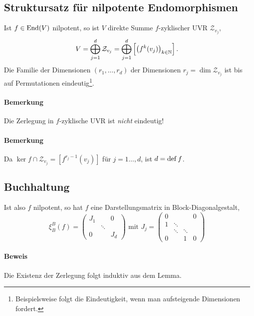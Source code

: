 \subsection{Struktursatz für nilpotente Endomorphismen}
	Ist $ f\in \operatorname{End}(V) $ nilpotent, so ist $ V $ direkte Summe $ f $-zyklischer UVR $ \mathcal{Z}_{v_j} $,
		\[ V = \bigoplus_{j=1}^d \mathcal{Z}_{v_j} =
		\bigoplus_{j=1}^d \left[\left(f^k(v_j)\right)_{k\in \mathbb{N}}\right].  \]
	Die Familie der Dimensionen $ (r_1,\dots,r_d) $ der Dimensionen $ r_j = \dim \mathcal{Z}_{v_j} $ ist bis auf Permutationen eindeutig\footnote{Beispielsweise folgt die Eindeutigkeit, wenn man aufsteigende Dimensionen fordert.}.
\paragraph{Bemerkung}
	Die Zerlegung in $ f $-zyklische UVR ist \emph{nicht} eindeutig!
\paragraph{Bemerkung}
	Da $ \ker f\cap \mathcal{Z}_{v_j} = \left[f^{r_j-1}(v_j) \right] $ für $ j=1\dots,d $, ist $ d = \operatorname{def} f $.
\subsection{Buchhaltung}
	Ist also $ f $ nilpotent, so hat $ f $ eine Darstellungsmatrix in Block-Diagonalgestalt,
		\[ \xi_B^B(f) = \begin{pmatrix}
		J_1 & & 0 \\
		& \ddots & \\
		0 & & J_d
		\end{pmatrix} \text{ mit } J_j = \begin{pmatrix}
		0 & & & 0\\1 & \ddots & &\\ & \ddots &\ddots &\\ 0 & & 1 & 0
		\end{pmatrix} \]
\paragraph{Beweis}
	Die Existenz der Zerlegung folgt induktiv aus dem Lemma.
	
